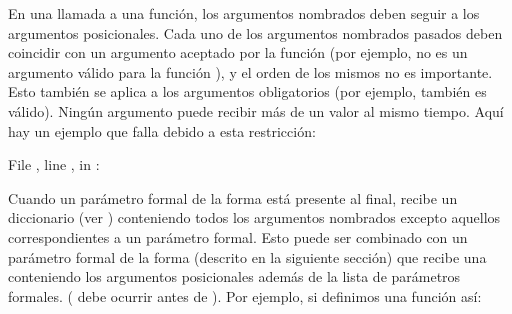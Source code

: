 \documentclass[a5paper,10pt,spanish]{sphinxmanual}
\begin{document}
\sphinxAtStartPar
En una llamada a una función, los argumentos nombrados deben seguir a los argumentos posicionales. Cada uno de los argumentos nombrados pasados deben coincidir con un argumento aceptado por la función (por ejemplo,  no es un argumento válido para la función ), y el orden de los mismos no es importante. Esto también se aplica a los argumentos obligatorios (por ejemplo,  también es válido). Ningún argumento puede recibir más de un valor al mismo tiempo. Aquí hay un ejemplo que falla debido a esta restricción:

\begin{sphinxVerbatim}[commandchars=\\\{\}]
 
    
 
  File , line , in 
: 
\end{sphinxVerbatim}

\sphinxAtStartPar
Cuando un parámetro formal de la forma  está presente al final, recibe un diccionario (ver ) conteniendo todos los argumentos nombrados excepto aquellos correspondientes a un parámetro formal. Esto puede ser combinado con un parámetro formal de la forma  (descrito en la siguiente sección) que recibe una {\hyperref[\detokenize{tutorial/datastructures:tut-tuples}]{}} conteniendo los argumentos posicionales además de la lista de parámetros formales. ( debe ocurrir antes de ). Por ejemplo, si definimos una función así:
\end{document}
